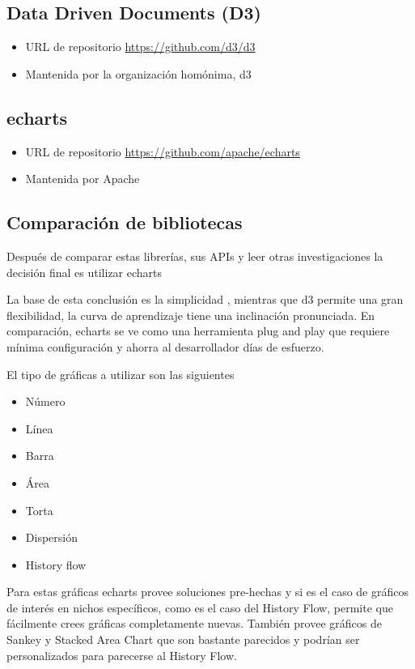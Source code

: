 \subsection{ Data Driven Documents (D3) }
\begin{itemize}
    \item URL de repositorio \href{https://github.com/d3/d3}{https://github.com/d3/d3}
    \item Mantenida por la organización homónima, d3
\end{itemize}

\subsection{ echarts }
\begin{itemize}
    \item URL de repositorio \href{https://github.com/apache/echarts}{https://github.com/apache/echarts}
    \item Mantenida por Apache
\end{itemize}

\subsection{ Comparación de bibliotecas }

Después de comparar estas librerías, sus APIs y leer otras investigaciones la decisión final es utilizar echarts

La base de esta conclusión es la simplicidad \cite{EchartsDecision}, mientras que d3 permite una gran flexibilidad, la curva de aprendizaje tiene una inclinación pronunciada. 
En comparación, echarts se ve como una herramienta plug and play que requiere mínima configuración y ahorra al desarrollador días de esfuerzo.

El tipo de gráficas a utilizar son las siguientes
\begin{itemize}    
    \item Número
    \item Línea
    \item Barra
    \item Área
    \item Torta
    \item Dispersión
    \item History flow
\end{itemize}

Para estas gráficas echarts provee soluciones pre-hechas y si es el caso de gráficos de interés en nichos específicos, como es el caso del History Flow, permite que fácilmente crees gráficas completamente nuevas. 
También provee gráficos de Sankey y Stacked Area Chart que son bastante parecidos y podrían ser personalizados para parecerse al History Flow. 

